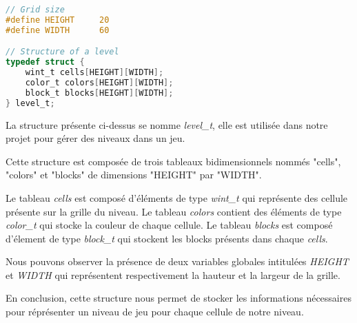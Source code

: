 \lstset{style=mystyle}
\begin{lstlisting}[language=C, caption=Structure d'un level]
// Grid size
#define HEIGHT     20
#define WIDTH      60

// Structure of a level
typedef struct {
    wint_t cells[HEIGHT][WIDTH];
    color_t colors[HEIGHT][WIDTH];
    block_t blocks[HEIGHT][WIDTH];
} level_t;
\end{lstlisting}

La structure présente ci-dessus se nomme \textit{level\_t}, elle est utilisée dans notre projet pour gérer des niveaux dans un jeu.

Cette structure est composée de trois tableaux bidimensionnels nommés "cells", "colors" et "blocks" de dimensions "HEIGHT" par "WIDTH".

Le tableau \textit{cells} est composé d'éléments de type \textit{wint\_t} qui représente des cellule présente sur la grille du niveau. Le tableau \textit{colors} contient des éléments de type \textit{color\_t} qui stocke la couleur de chaque cellule. Le tableau \textit{blocks} est composé d'élement de type \textit{block\_t} qui stockent les blocks présents dans chaque \textit{cells}.


Nous pouvons observer la présence de deux variables globales intitulées \textit{HEIGHT} et \textit{WIDTH} qui représentent respectivement la hauteur et la largeur de la grille.


En conclusion, cette structure nous permet de stocker les informations nécessaires pour réprésenter un niveau de jeu pour chaque cellule de notre niveau.
\newpage